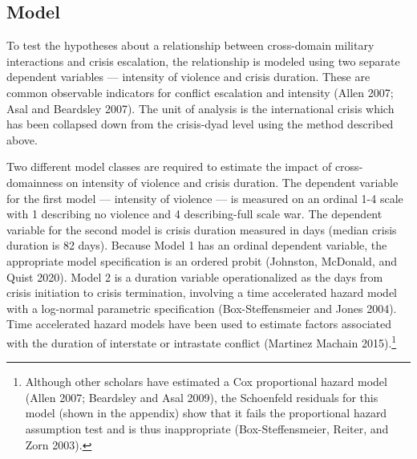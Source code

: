 \documentclass[
]{article}
\begin{document}
\hypertarget{model}{%
\subsection{Model}\label{model}}

To test the hypotheses about a relationship between cross-domain military interactions and crisis escalation, the relationship is modeled using two separate dependent variables --- intensity of violence and crisis duration. These are common observable indicators for conflict escalation and intensity (Allen 2007; Asal and Beardsley 2007). The unit of analysis is the international crisis which has been collapsed down from the crisis-dyad level using the method described above.

Two different model classes are required to estimate the impact of cross-domainness on intensity of violence and crisis duration. The dependent variable for the first model --- intensity of violence --- is measured on an ordinal 1-4 scale with 1 describing no violence and 4 describing-full scale war. The dependent variable for the second model is crisis duration measured in days (median crisis duration is 82 days). Because Model 1 has an ordinal dependent variable, the appropriate model specification is an ordered probit (Johnston, McDonald, and Quist 2020). Model 2 is a duration variable operationalized as the days from crisis initiation to crisis termination, involving a time accelerated hazard model with a log-normal parametric specification (Box-Steffensmeier and Jones 2004). Time accelerated hazard models have been used to estimate factors associated with the duration of interstate or intrastate conflict (Martinez Machain 2015).\footnote{Although other scholars have estimated a Cox proportional hazard model (Allen 2007; Beardsley and Asal 2009), the Schoenfeld residuals for this model (shown in the appendix) show that it fails the proportional hazard assumption test and is thus inappropriate (Box-Steffensmeier, Reiter, and Zorn 2003).}
\end{document}
